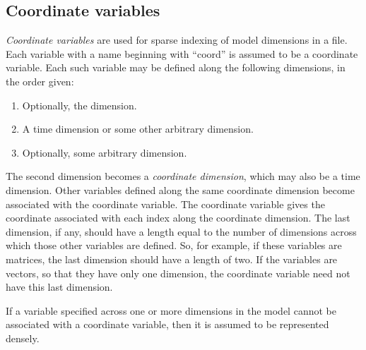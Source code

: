 \subsection{Coordinate variables\label{Coordinate_variables}}

\emph{Coordinate variables} are used for sparse indexing of model dimensions
in a file. Each variable with a name beginning with ``coord'' is assumed to be
a coordinate variable. Each such variable may be defined along the following
dimensions, in the order given:
\begin{enumerate}
\item Optionally, the  dimension.
\item A time dimension or some other arbitrary dimension.
\item Optionally, some arbitrary dimension.
\end{enumerate}
The second dimension becomes a \emph{coordinate
  dimension}, which may also be a time
dimension. Other variables defined along the same coordinate dimension become
associated with the coordinate variable. The coordinate variable gives the
coordinate associated with each index along the coordinate dimension. The last
dimension, if any, should have a length equal to the number of dimensions
across which those other variables are defined. So, for example, if these
variables are matrices, the last dimension should have a length of two. If the
variables are vectors, so that they have only one dimension, the coordinate
variable need not have this last dimension.


If a variable specified across one or more dimensions in the model cannot be
associated with a coordinate variable, then it is assumed to be represented
densely.

